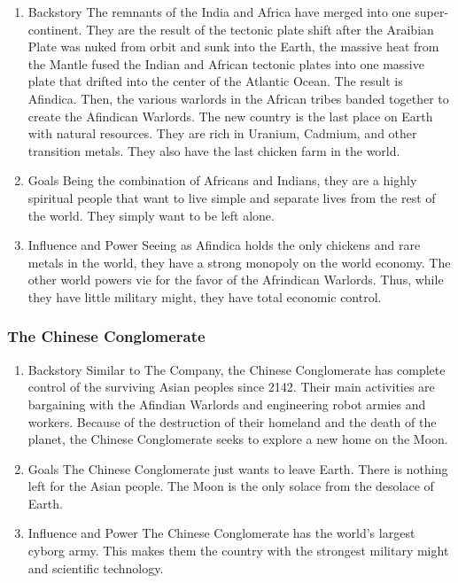\documentclass[11pt]{article}
\begin{document}
\begin{enumerate}
\item Backstory
\label{sec:org8a37e43}
The remnants of the India and Africa have merged into one super-continent. They are the result of the tectonic plate shift after the Araibian Plate was nuked from orbit and sunk into the Earth, the massive heat from the Mantle fused the Indian and African tectonic plates into one massive plate that drifted into the center of the Atlantic Ocean. The result is Afindica. Then, the various warlords in the African tribes banded together to create the Afindican Warlords. The new country is the last place on Earth with natural resources. They are rich in Uranium, Cadmium, and other transition metals. They also have the last chicken farm in the world.

\item Goals
\label{sec:org88c54a0}
Being the combination of Africans and Indians, they are a highly spiritual people that want to live simple and separate lives from the rest of the world. They simply want to be left alone.

\item Influence and Power
\label{sec:orgc24c4a6}
Seeing as Afindica holds the only chickens and rare metals in the world, they have a strong monopoly on the world economy. The other world powers vie for the favor of the Afrindican Warlords. Thus, while they have little military might, they have total economic control.
\end{enumerate}

\subsubsection{The Chinese Conglomerate}
\label{sec:org1fbe5e6}

\begin{enumerate}
\item Backstory
\label{sec:orgc723a42}
Similar to The Company, the Chinese Conglomerate has complete control of the surviving Asian peoples since 2142. Their main activities are bargaining with the Afindian Warlords and engineering robot armies and workers. Because of the destruction of their homeland and the death of the planet, the Chinese Conglomerate seeks to explore a new home on the Moon.

\item Goals
\label{sec:orgab1c40c}
The Chinese Conglomerate just wants to leave Earth. There is nothing left for the Asian people. The Moon is the only solace from the desolace of Earth.

\item Influence and Power
\label{sec:org5fb63f4}
The Chinese Conglomerate has the world's largest cyborg army. This makes them the country with the strongest military might and scientific technology.
\end{enumerate}
\end{document}
